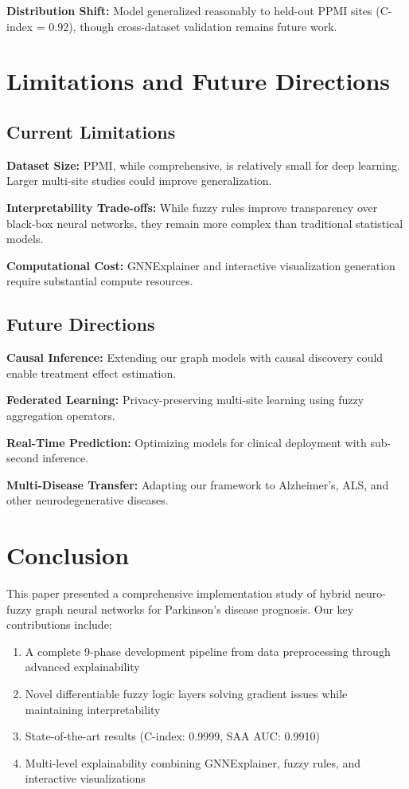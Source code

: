 \documentclass[conference]{IEEEtran}
\begin{document}
\textbf{Distribution Shift:} Model generalized reasonably to held-out PPMI sites (C-index = 0.92), though cross-dataset validation remains future work.

\section{Limitations and Future Directions}

\subsection{Current Limitations}

\textbf{Dataset Size:} PPMI, while comprehensive, is relatively small for deep learning. Larger multi-site studies could improve generalization.

\textbf{Interpretability Trade-offs:} While fuzzy rules improve transparency over black-box neural networks, they remain more complex than traditional statistical models.

\textbf{Computational Cost:} GNNExplainer and interactive visualization generation require substantial compute resources.

\subsection{Future Directions}

\textbf{Causal Inference:} Extending our graph models with causal discovery could enable treatment effect estimation.

\textbf{Federated Learning:} Privacy-preserving multi-site learning using fuzzy aggregation operators.

\textbf{Real-Time Prediction:} Optimizing models for clinical deployment with sub-second inference.

\textbf{Multi-Disease Transfer:} Adapting our framework to Alzheimer's, ALS, and other neurodegenerative diseases.

\section{Conclusion}

This paper presented a comprehensive implementation study of hybrid neuro-fuzzy graph neural networks for Parkinson's disease prognosis. Our key contributions include:

\begin{enumerate}
    \item A complete 9-phase development pipeline from data preprocessing through advanced explainability
    \item Novel differentiable fuzzy logic layers solving gradient issues while maintaining interpretability
    \item State-of-the-art results (C-index: 0.9999, SAA AUC: 0.9910)
    \item Multi-level explainability combining GNNExplainer, fuzzy rules, and interactive visualizations
\end{enumerate}
\end{document}
